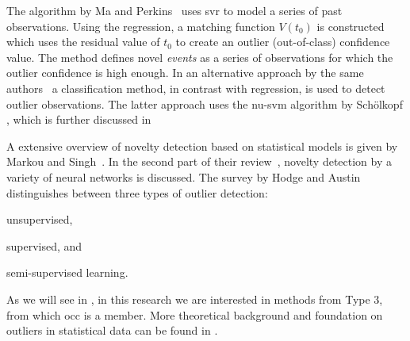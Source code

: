 The algorithm by Ma and Perkins~\cite{markou2003novelty} uses \gls{svr} to model a series of past observations.
Using the regression, a matching function $V(t_0)$ is constructed which uses the residual value of $t_0$ to create an outlier (out-of-class) confidence value.
The method defines novel \emph{events} as a series of observations for which the outlier confidence is high enough.
In an alternative approach by the same authors~\cite{ma2003time} a classification method, in contrast with regression, is used to detect outlier observations.
The latter approach uses the \gls{nu-svm} algorithm by Sch\"olkopf \etal \cite{scholkopf1999support}, which is further discussed in 

A extensive overview of novelty detection based on statistical models is given by Markou and Singh~\cite{markou2003novelty}.
In the second part of their review~\cite{markou2003novelty-neural}, novelty detection by a variety of neural networks is discussed.
The survey by Hodge and Austin~\cite{hodge2004survey} distinguishes between three types of outlier detection: \begin{inparaenum}[1)]
    \item unsupervised,
    \item supervised, and
    \item semi-supervised learning.
  \end{inparaenum}
As we will see in , in this research we are interested in methods from Type 3, from which \gls{occ} is a member.
More theoretical background and foundation on outliers in statistical data can be found in \cite{barnett1994outliers}.
